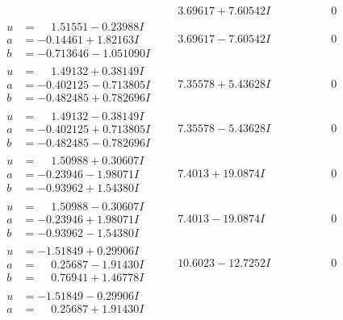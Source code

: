 \documentclass[1p]{elsarticle_modified}
\theoremstyle{definition}
\begin{document}
$$\begin{array}{c|c|c}
 & \phantom{-}3.69617 + 7.60542 I & \phantom{-0.000000 } 0 \\ \hline\begin{aligned}
u &= \phantom{-}1.51551 - 0.23988 I \\
a &= -0.14461 + 1.82163 I \\
b &= -0.713646 - 1.051090 I\end{aligned}
 & \phantom{-}3.69617 - 7.60542 I & \phantom{-0.000000 } 0 \\ \hline\begin{aligned}
u &= \phantom{-}1.49132 + 0.38149 I \\
a &= -0.402125 - 0.713805 I \\
b &= -0.482485 + 0.782696 I\end{aligned}
 & \phantom{-}7.35578 + 5.43628 I & \phantom{-0.000000 } 0 \\ \hline\begin{aligned}
u &= \phantom{-}1.49132 - 0.38149 I \\
a &= -0.402125 + 0.713805 I \\
b &= -0.482485 - 0.782696 I\end{aligned}
 & \phantom{-}7.35578 - 5.43628 I & \phantom{-0.000000 } 0 \\ \hline\begin{aligned}
u &= \phantom{-}1.50988 + 0.30607 I \\
a &= -0.23946 - 1.98071 I \\
b &= -0.93962 + 1.54380 I\end{aligned}
 & \phantom{-}7.4013 + 19.0874 I & \phantom{-0.000000 } 0 \\ \hline\begin{aligned}
u &= \phantom{-}1.50988 - 0.30607 I \\
a &= -0.23946 + 1.98071 I \\
b &= -0.93962 - 1.54380 I\end{aligned}
 & \phantom{-}7.4013 - 19.0874 I & \phantom{-0.000000 } 0 \\ \hline\begin{aligned}
u &= -1.51849 + 0.29906 I \\
a &= \phantom{-}0.25687 - 1.91430 I \\
b &= \phantom{-}0.76941 + 1.46778 I\end{aligned}
 & \phantom{-}10.6023 - 12.7252 I & \phantom{-0.000000 } 0 \\ \hline\begin{aligned}
u &= -1.51849 - 0.29906 I \\
a &= \phantom{-}0.25687 + 1.91430 I \\

\end{aligned}
\end{array}$$
\end{document}
